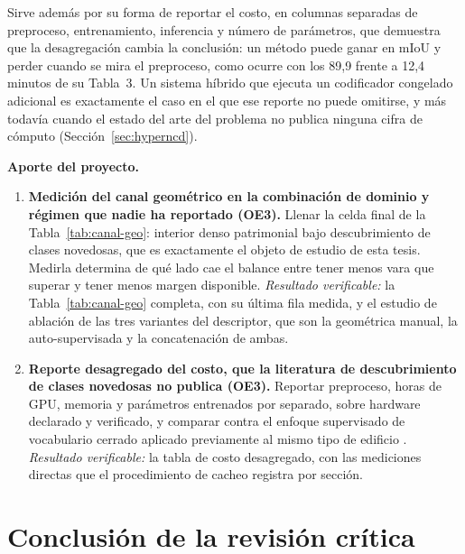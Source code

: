 Sirve además por su forma de reportar el costo, en columnas separadas de
preproceso, entrenamiento, inferencia y número de parámetros, que demuestra que
la desagregación cambia la conclusión: un método puede ganar en mIoU y perder
cuando se mira el preproceso, como ocurre con los 89,9 frente a 12,4 minutos de
su Tabla~3. Un sistema híbrido que ejecuta un codificador congelado adicional es
exactamente el caso en el que ese reporte no puede omitirse, y más todavía cuando
el estado del arte del problema no publica ninguna cifra de cómputo
(Sección~\ref{sec:hyperncd}).

\textbf{Aporte del proyecto.}

\begin{enumerate}
\item[\textbf{A8}] \textbf{Medición del canal geométrico en la combinación de
dominio y régimen que nadie ha reportado (OE3).} Llenar la celda final de la
Tabla~\ref{tab:canal-geo}: interior denso patrimonial bajo descubrimiento de
clases novedosas, que es exactamente el objeto de estudio de esta tesis. Medirla
determina de qué lado cae el balance entre tener menos vara que superar y tener
menos margen disponible. \emph{Resultado verificable:} la
Tabla~\ref{tab:canal-geo} completa, con su última fila medida, y el estudio de
ablación de las tres variantes del descriptor, que son la geométrica manual, la
auto-supervisada y la concatenación de ambas.

\item[\textbf{A9}] \textbf{Reporte desagregado del costo, que la literatura de
descubrimiento de clases novedosas no publica (OE3).} Reportar preproceso, horas
de GPU, memoria y parámetros entrenados por separado, sobre hardware declarado y
verificado, y comparar contra el enfoque supervisado de vocabulario cerrado
aplicado previamente al mismo tipo de edificio \cite{tesisutec2024}.
\emph{Resultado verificable:} la tabla de costo desagregado, con las mediciones
directas que el procedimiento de cacheo registra por sección.
\end{enumerate}

\section[Conclusión: aportes del proyecto]{Conclusión de la revisión crítica}
\label{sec:aporte}

